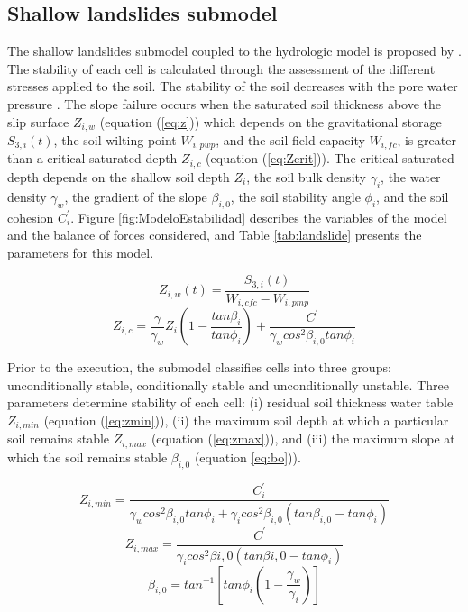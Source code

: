 \documentclass[hess, manuscript]{copernicus}
\begin{document}
\subsection{Shallow landslides submodel}

The shallow landslides submodel coupled to the hydrologic model is proposed by  \citet{Aristizabal2016}.  The stability of each cell is calculated through the assessment of the different stresses applied to the soil. The stability of the soil decreases with the pore water pressure \citep{Graham1984}. The slope failure occurs when the saturated soil thickness above the slip surface $Z_{i,w}$ (equation (\ref{eq:z})) which depends on the gravitational storage $S_{3,i}(t)$, the soil wilting point $W_{i,pwp}$, and the soil field capacity $W_{i,fc}$, is greater than a critical saturated depth $Z_{i,c}$ (equation (\ref{eq:Zcrit})). The critical saturated depth depends on the shallow soil depth $Z_i$, the soil bulk density $\gamma_i$, the water density $\gamma_w$, the gradient of the slope $\beta_{i,0}$, the soil stability angle $\phi_i$, and the soil cohesion $C^{'}_i$.  Figure \ref{fig:ModeloEstabilidad} describes the variables of the model and the balance of forces considered, and Table \ref{tab:landslide} presents the parameters for this model.

\begin{equation}
 Z_{i,w}(t) = \frac{S_{3,i}(t)}{W_{i,cfc} - W_{i,pmp}}
 \label{eq:z}
\end{equation}
\begin{equation}
 Z_{i,c} = \frac{\gamma}{\gamma_w} Z_i \left( 1-\frac{tan \beta_i}{tan\phi_i} \right)
     + \frac{C^{'}}{\gamma_w cos^2 \beta_{i,0} tan\phi_i}
 \label{eq:Zcrit}
\end{equation}

Prior to the execution, the submodel classifies cells into three groups: unconditionally stable, conditionally stable and unconditionally unstable. Three parameters determine stability of each cell: (i) residual soil thickness water table $Z_{i,min}$ (equation (\ref{eq:zmin})), (ii) the maximum soil depth at which a particular soil remains stable $Z_{i,max}$  (equation (\ref{eq:zmax})), and (iii) the maximum slope at which the soil remains stable $\beta_{i,0}$ (equation \ref{eq:bo})). 

\begin{equation}
 Z_{i,min} = \frac{C^{'}_i}{\gamma_w cos^2 \beta_{i,0} tan \phi_i + \gamma_i cos^2 \beta_{i,0} (tan\beta_{i,0} - tan \phi_i)}
    \label{eq:zmin}
\end{equation}
\begin{equation}
 Z_{i,max} = \frac{C^{'}}{\gamma_i cos^2 \beta{i,0} (tan\beta{i,0} - tan \phi_i)}
 \label{eq:zmax}
\end{equation}
\begin{equation}
 \beta_{i,0} = tan ^{-1} \left[ tan \phi_i \left( 1- \frac{\gamma_w}{\gamma_i}\right) \right]
 \label{eq:bo}
\end{equation}
\end{document}
